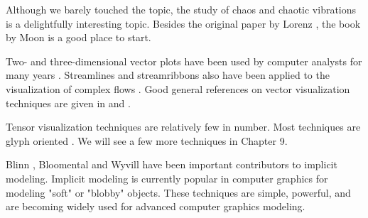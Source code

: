 Although we barely touched the topic, the study of chaos and chaotic vibrations is a delightfully interesting topic. Besides the original paper by Lorenz \cite{Lorenz63}, the book by Moon \cite{Moon87} is a good place to start.

Two- and three-dimensional vector plots have been used by computer analysts for many years \cite{Fuller80}. Streamlines and streamribbons also have been applied to the visualization of complex flows \cite{Volpe89}. Good general references on vector visualization techniques are given in \cite{Helman90} and \cite{Richter90}.

Tensor visualization techniques are relatively few in number. Most techniques are glyph oriented \cite{Haber90} \cite{deLeeuw93}. We will see a few more techniques in Chapter 9.

Blinn \cite{Blinn82}, Bloomental \cite{Bloomenthal88} \cite{Bloomenthal97} and Wyvill \cite{Wyvill86} have been important contributors to implicit modeling. Implicit modeling is currently popular in computer graphics for modeling "soft" or "blobby" objects. These techniques are simple, powerful, and are becoming widely used for advanced computer graphics modeling.


\printbibliography


